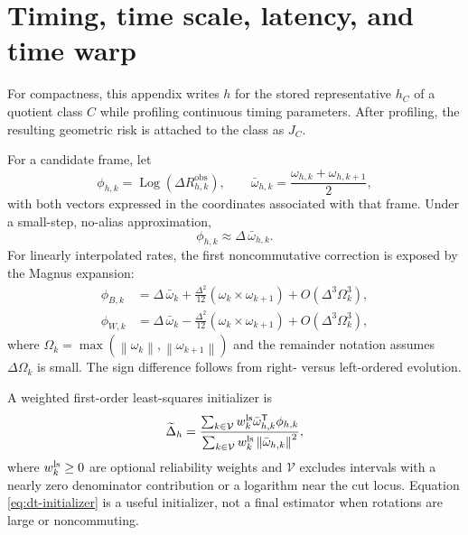 \documentclass[11pt]{article}
\newcommand{\T}{\mathsf{T}}
\newcommand{\Log}{\operatorname{Log}}
\newcommand{\norm}[1]{\left\lVert #1 \right\rVert}
\begin{document}
    \section{Timing, time scale, latency, and time warp}\label{app:timing}

    For compactness, this appendix writes $h$ for the stored representative $h_C$ of a
    quotient class $C$ while profiling continuous timing parameters. After profiling, the
    resulting geometric risk is attached to the class as $J_C$.

    For a candidate frame, let
    \begin{equation}
        \phi_{h,k}=\Log(\Delta R_{h,k}^{\mathrm{obs}}),
        \qquad
        \bar\omega_{h,k}=\frac{\omega_{h,k}+\omega_{h,k+1}}{2},
    \end{equation}
    with both vectors expressed in the coordinates associated with that frame. Under a
    small-step, no-alias approximation,
    \begin{equation}
        \phi_{h,k}\approx \Delta\,\bar\omega_{h,k}.
    \end{equation}
    For linearly interpolated rates, the first noncommutative correction is exposed by the
    Magnus expansion:
    \begin{align}
        \phi_{B,k}
        &=\Delta\,\bar\omega_k
        +\frac{\Delta^2}{12}(\omega_k\times\omega_{k+1})
        +O(\Delta^3\Omega_k^3),\\
        \phi_{W,k}
        &=\Delta\,\bar\omega_k
        -\frac{\Delta^2}{12}(\omega_k\times\omega_{k+1})
        +O(\Delta^3\Omega_k^3),
    \end{align}
    where $\Omega_k=\max(\norm{\omega_k},\norm{\omega_{k+1}})$ and the remainder notation
    assumes $\Delta\Omega_k$ is small. The sign difference follows from right- versus
    left-ordered evolution.

    A weighted first-order least-squares initializer is
    \begin{equation}
        \widetilde\Delta_h
        =\frac{\sum_{k\in\mathcal V}w_k^{\rm ls}\bar\omega_{h,k}^{\T}\phi_{h,k}}
        {\sum_{k\in\mathcal V}w_k^{\rm ls}\norm{\bar\omega_{h,k}}^2},
        \label{eq:dt-initializer}
    \end{equation}
    where $w_k^{\rm ls}\ge0$ are optional reliability weights and $\mathcal V$ excludes intervals
    with a nearly zero denominator contribution or a logarithm near the cut locus. Equation
    \eqref{eq:dt-initializer} is a useful initializer, not a final estimator when rotations
    are large or noncommuting.
\end{document}
